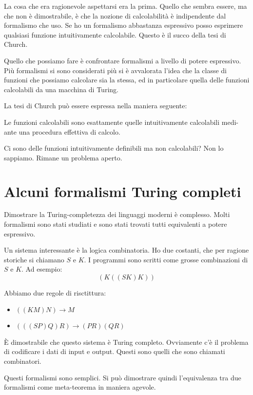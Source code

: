 La cosa che era ragionevole aspettarsi era la prima. Quello che sembra essere, ma che non è
dimostrabile, è che la nozione di calcolabilità è indipendente dal formalismo che uso. Se ho un
formalismo abbastanza espressivo posso esprimere qualsiasi funzione intuitivamente calcolabile.
Questo è il succo della tesi di Church.

Quello che possiamo fare è confrontare formalismi a livello di potere espressivo. Più formalismi
si sono considerati più si è avvalorata l'idea che la classe di funzioni che possiamo calcolare sia
la stessa, ed in particolare quella delle funzioni calcolabili da una macchina di Turing.

La tesi di Church può essere espressa nella maniera seguente:
\begin{thm}
    Le funzioni calcolabili sono esattamente quelle intuitivamente calcolabili medi-
    ante una procedura effettiva di calcolo.
\end{thm}

Ci sono delle funzioni intuitivamente definibili ma non calcolabili? Non lo sappiamo. Rimane un
problema aperto.

\section{Alcuni formalismi Turing completi}

Dimostrare la Turing-completezza dei linguaggi moderni è complesso. Molti formalismi sono stati
studiati e sono stati trovati tutti equivalenti a potere espressivo.

Un sistema interessante è la logica combinatoria. Ho due costanti, che per ragione storiche si
chiamano $S$ e $K$. I programmi sono scritti come grosse combinazioni di $S$ e $K$. Ad esempio:
\begin{equation*}
    (K ((S K) K))
\end{equation*}

Abbiamo due regole di risctittura:
\begin{itemize}
    \item $((K M) N) \to M$ 
    \item $(((S P) Q) R) \to (P R) (Q R)$
\end{itemize}

È dimostrabile che questo sistema è Turing completo. Ovviamente c'è il problema di codificare i
dati di input e output. Questi sono quelli che sono chiamati combinatori.

Questi formalismi sono semplici. Si può dimostrare quindi l'equivalenza tra due formalismi come
meta-teorema in maniera agevole.

